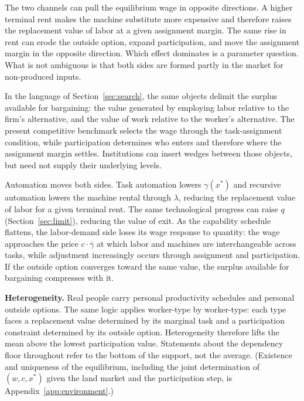 \documentclass[12pt]{article}
\theoremstyle{plain}
\begin{document}
The two channels can pull the equilibrium wage in opposite directions. A higher
terminal rent makes the machine substitute more expensive and therefore raises
the replacement value of labor at a given assignment margin. The same rise in
rent can erode the outside option, expand participation, and move the assignment
margin in the opposite direction. Which effect dominates is a parameter
question. What is not ambiguous is that both sides are formed partly in the
market for non-produced inputs.

In the language of Section~\ref{sec:search}, the same objects delimit the surplus
available for bargaining: the value generated by employing labor relative to
the firm's alternative, and the value of work relative to the worker's
alternative. The present competitive benchmark selects the wage through the
task-assignment condition, while participation determines who enters and
therefore where the assignment margin settles. Institutions can insert wedges
between those objects, but need not supply their underlying levels.

Automation moves both sides. Task automation lowers $\gamma(x^*)$ and recursive
automation lowers the machine rental through $\lambda$, reducing the replacement
value of labor for a given terminal rent. The same technological progress can
raise $q$ (Section~\ref{sec:limit}), reducing the value of exit. As the capability
schedule flattens, the labor-demand side loses its wage response to quantity: the
wage approaches the price $c\cdot\bar{\gamma}$ at which labor and machines are
interchangeable across tasks, while adjustment increasingly occurs through
assignment and participation. If the outside option
converges toward the same value, the surplus available for bargaining compresses
with it.

\textbf{Heterogeneity.} Real people carry personal productivity schedules and
personal outside options. The same logic applies worker-type by worker-type:
each type faces a replacement value determined by its marginal task and a
participation constraint determined by its outside option. Heterogeneity
therefore lifts the mean above the lowest participation value. Statements about
the dependency floor throughout refer to the bottom of the support, not the
average. (Existence and uniqueness of the equilibrium, including the joint
determination of $(w,c,x^*)$ given the land market and the participation step,
is Appendix~\ref{app:environment}.)
\end{document}

